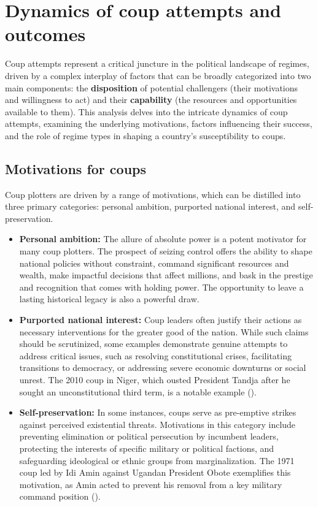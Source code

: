 \documentclass[
  12pt,
]{report}
\begin{document}
\section{Dynamics of coup attempts and
outcomes}\label{dynamics-of-coup-attempts-and-outcomes}

Coup attempts represent a critical juncture in the political landscape
of regimes, driven by a complex interplay of factors that can be broadly
categorized into two main components: the \textbf{disposition} of
potential challengers (their motivations and willingness to act) and
their \textbf{capability} (the resources and opportunities available to
them). This analysis delves into the intricate dynamics of coup
attempts, examining the underlying motivations, factors influencing
their success, and the role of regime types in shaping a country's
susceptibility to coups.

\subsection{Motivations for coups}\label{motivations-for-coups}

Coup plotters are driven by a range of motivations, which can be
distilled into three primary categories: personal ambition, purported
national interest, and self-preservation.

\begin{itemize}
\item
  \textbf{Personal ambition:} The allure of absolute power is a potent
  motivator for many coup plotters. The prospect of seizing control
  offers the ability to shape national policies without constraint,
  command significant resources and wealth, make impactful decisions
  that affect millions, and bask in the prestige and recognition that
  comes with holding power. The opportunity to leave a lasting
  historical legacy is also a powerful draw.
\item
  \textbf{Purported national interest:} Coup leaders often justify their
  actions as necessary interventions for the greater good of the nation.
  While such claims should be scrutinized, some examples demonstrate
  genuine attempts to address critical issues, such as resolving
  constitutional crises, facilitating transitions to democracy, or
  addressing severe economic downturns or social unrest. The 2010 coup
  in Niger, which ousted President Tandja after he sought an
  unconstitutional third term, is a notable example
  ().
\item
  \textbf{Self-preservation:} In some instances, coups serve as
  pre-emptive strikes against perceived existential threats. Motivations
  in this category include preventing elimination or political
  persecution by incumbent leaders, protecting the interests of specific
  military or political factions, and safeguarding ideological or ethnic
  groups from marginalization. The 1971 coup led by Idi Amin against
  Ugandan President Obote exemplifies this motivation, as Amin acted to
  prevent his removal from a key military command position
  ().
\end{itemize}
\end{document}
